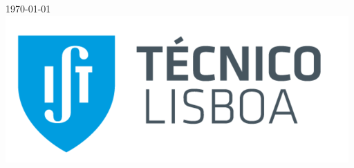\begin{titlepage}
\begin{center} \large
 
\end{center}
\vspace*{0.35cm}

{\large \today }\\[0.9cm] %



\includegraphics[scale=0.5]{tecnico.png}\\[1cm]
   

\end{titlepage}
